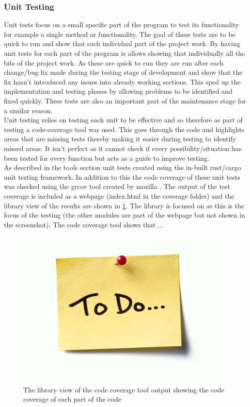 \documentclass[11pt,a4paper]{report}
\begin{document}
\subsubsection{Unit Testing}
Unit tests focus on a small specific part of the program to test its functionality for example a single method or functionality. The goal of these tests are to be quick to run and show that each individual part of the project work. By having unit tests for each part of the program is allows showing that individually all the bits of the project work. As these are quick to run they are run after each change/bug fix made during the testing stage of development and show that the fix hasn't introduced any issues into already working sections. This sped up the implementation and testing phases by allowing problems to be identified and fixed quickly. These tests are also an important part of the maintenance stage for a similar reason.\\

Unit testing relies on testing each unit to be effective and so therefore as part of testing a code-coverage tool was used. This goes through the code and highlights areas that are missing tests thereby making it easier during testing to identify missed areas. It isn't perfect as it cannot check if every possibility/situation has been tested for every function but acts as a guide to improve testing.\\

As described in the tools section unit tests created using the in-built rust/cargo unit testing framework. In addition to this the code coverage of these unit tests was checked using the grcov tool created by mozilla \cite{GRCOV}. The output of the test coverage is included as a webpage (index.html in the coverage folder) and the library view of the results are shown in \ref{GRCOV_TOP_LEVEL}. The library is focused on as this is the focus of the testing (the other modules are part of the webpage but not shown in the screenshot). The code coverage tool shows that ... 

\begin{figure}[H]
	\label{GRCOV_TOP_LEVEL}
	\includegraphics[width=\textwidth]{todo.jpg}
	\caption{The library view of the code coverage tool output showing the code coverage of each part of the code}
\end{figure}
\end{document}
